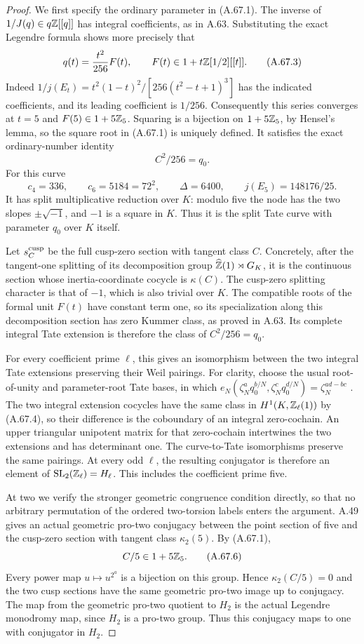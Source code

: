 \begin{proof}
We first specify the ordinary parameter in (A.67.1).
The inverse of $1/J(q)\in q\mathbb Z[[q]]$ has integral
coefficients, as in A.63.  Substituting the exact Legendre
formula shows more precisely that
\[
               q(t)=\frac{t^2}{256}F(t),
                      \qquad F(t)\in1+t\mathbb Z[1/2][[t]].
\tag{A.67.3}
\]
Indeed
$1/j(E_t)=t^2(1-t)^2/[256(t^2-t+1)^3]$ has the
indicated coefficients, and its leading coefficient is
$1/256$.
Consequently this series converges at $t=5$ and
$F(5)\in1+5\mathbb Z_5$.  Squaring is a bijection on
$1+5\mathbb Z_5$, by Hensel's lemma, so the square root in
(A.67.1) is uniquely defined.  It satisfies the exact
ordinary-number identity
\[
                             C^2/256=q_0.
\tag{A.67.4}
\]
For this curve
\[
 c_4=336,\qquad c_6=5184=72^2,\qquad
 \Delta=6400,\qquad j(E_5)=148176/25.
\tag{A.67.5}
\]
It has split multiplicative reduction over $K$: modulo
five the node has the two slopes $\pm\sqrt{-1}$, and
$-1$ is a square in $K$.
Thus it is the split Tate curve with parameter $q_0$
over $K$ itself.

Let $s_C^{\rm cusp}$ be the full cusp-zero section with
tangent class $C$.  Concretely, after the tangent-one
splitting of its decomposition group
$\widehat{\mathbb Z}(1)\rtimes G_K$, it is the continuous
section whose inertia-coordinate cocycle is $\kappa(C)$.
The cusp-zero splitting character is that of $-1$,
which is also trivial over $K$.
The compatible roots of the formal unit $F(t)$ have
constant term one, so its specialization along this
decomposition section has zero Kummer class, as proved
in A.63.  Its complete integral Tate extension is
therefore the class of $C^2/256=q_0$.

For every coefficient prime $\ell$, this gives an
isomorphism between the two integral Tate extensions
preserving their Weil pairings.
For clarity, choose the usual root-of-unity and
parameter-root Tate bases, in which
$e_N(\zeta_N^a q_0^{b/N},\zeta_N^c q_0^{d/N})
=\zeta_N^{ad-bc}$
\cite[\S19.2]{LegIovitaMasdeu2009}.
The two integral extension cocycles have the same class
in $H^1(K,\mathbb Z_\ell(1))$ by (A.67.4), so their difference
is the coboundary of an integral zero-cochain.
An upper triangular unipotent matrix for that
zero-cochain intertwines the two extensions and has
determinant one.  The curve-to-Tate isomorphisms
preserve the same pairings.
At every odd $\ell$, the resulting conjugator is
therefore an element of
$\operatorname{SL}_2(\mathbb Z_\ell)=H_\ell$.
This includes the coefficient prime five.

At two we verify the stronger geometric congruence
condition directly, so that no arbitrary permutation
of the ordered two-torsion labels enters the argument.
A.49 gives an actual geometric pro-two conjugacy
between the point section of five and the cusp-zero
section with tangent class $\kappa_2(5)$.
By (A.67.1),
\[
                         C/5\in1+5\mathbb Z_5.
\tag{A.67.6}
\]
Every power map $u\mapsto u^{2^a}$ is a bijection on
this group.  Hence $\kappa_2(C/5)=0$ and the two
cusp sections have the same geometric pro-two image
up to conjugacy.  The map from the geometric pro-two
quotient to $H_2$ is the actual Legendre monodromy map,
since $H_2$ is a pro-two group.  Thus this conjugacy
maps to one with conjugator in $H_2$.


\end{proof}
